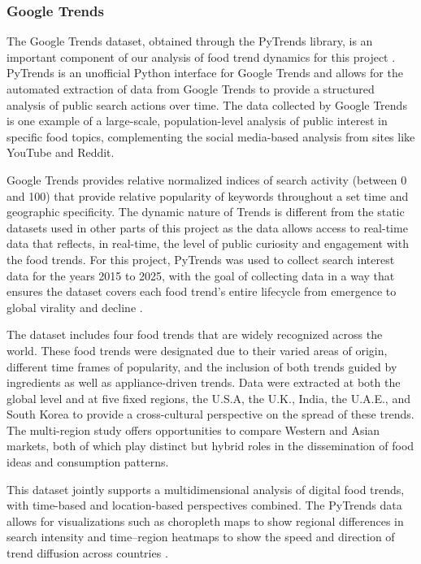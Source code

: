 \documentclass{article}
\begin{document}
\subsubsection{Google Trends}
The Google Trends dataset, obtained through the PyTrends library, is an important component of our analysis of food trend dynamics for this project \citep{pytrends_api}. PyTrends is an unofficial Python interface for Google Trends and allows for the automated extraction of data from Google Trends to provide a structured analysis of public search actions over time. The data collected by Google Trends is one example of a large-scale, population-level analysis of public interest in specific food topics, complementing the social media-based analysis from sites like YouTube and Reddit.

Google Trends provides relative normalized indices of search activity (between 0 and 100) that provide relative popularity of keywords throughout a set time and geographic specificity. The dynamic nature of Trends is different from the static datasets used in other parts of this project as the data allows access to real-time data that reflects, in real-time, the level of public curiosity and engagement with the food trends. For this project, PyTrends was used to collect search interest data for the years 2015 to 2025, with the goal of collecting data in a way that ensures the dataset covers each food trend’s entire lifecycle from emergence to global virality and decline \citep{pytrends_api}.

The dataset includes four food trends that are widely recognized across the world. These food trends were designated due to their varied areas of origin, different time frames of popularity, and the inclusion of both trends guided by ingredients as well as appliance-driven trends. Data were extracted at both the global level and at five fixed regions, the U.S.A, the U.K., India, the U.A.E., and South Korea to provide a cross-cultural perspective on the spread of these trends. The multi-region study offers opportunities to compare Western and Asian markets, both of which play distinct but hybrid roles in the dissemination of food ideas and consumption patterns.

This dataset jointly supports a multidimensional analysis of digital food trends, with time-based and location-based perspectives combined. The PyTrends data allows for visualizations such as choropleth maps to show regional differences in search intensity and time–region heatmaps to show the speed and direction of trend diffusion across countries \citep{pytrends_api}.
\end{document}
